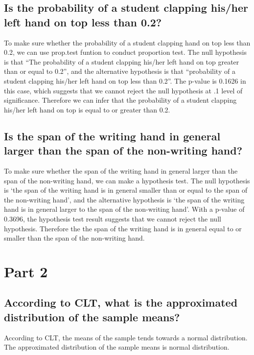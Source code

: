 \documentclass{zjureport}
\begin{document}
\subsection{Is the probability of a student clapping his/her left hand on top less than 0.2?}
To make sure whether the probability of a student clapping hand on top less than 0.2, we can use prop.test funtion to conduct proportion test. The null hypothesis is that “The probability of a student clapping his/her left hand on top greater than or equal to 0.2”, and the alternative hypothesis is that “probability of a student clapping his/her left hand on top less than 0.2”. The p-value is 0.1626 in this case, which suggests that we cannot reject the null hypothesis at .1 level of significance. Therefore we can infer that the probability of a student clapping his/her left hand on top is equal to or greater than 0.2.
\subsection{Is the span of the writing hand in general larger than the span of the non-writing hand?}
To make sure whether the span of the writing hand in general larger than the span of the non-writing hand, we can make a hypothesis test. The null hypothesis is ‘the span of the writing hand is in general smaller than or equal to the span of the non-writing hand’, and the alternative hypothesis is ‘the span of the writing hand is in general larger to the span of the non-writing hand’. With a p-value of 0.3696, the hypothesis test result suggests that we cannot reject the null hypothesis. Therefore the the span of the writing hand is in general equal to or smaller than the span of the non-writing hand.

\section{Part 2}
\subsection{According to CLT, what is the approximated distribution of the sample means?}
According to CLT, the means of the sample tends towards a normal distribution. The approximated distribution of the sample means is normal distribution.
\end{document}
